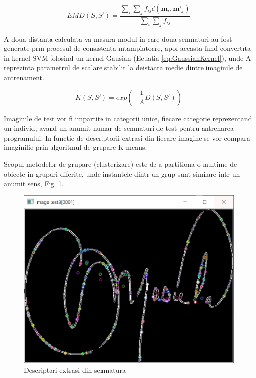 \documentclass[conference]{IEEEtran}
\begin{document}
\begin{equation} \label{eq:EarthMoversDistance}
EMD(S,S')=\frac{\sum_{i}\sum_{j}f_{ij}d(\textbf{m}_{i},\textbf{m'}_{j})}{\sum_{i}\sum_{j}f_{ij}}
\end{equation}

A doua distanta calculata va masura modul in care doua semnaturi au fost generate prin procesul de consistenta intamplatoare, apoi aceasta fiind convertita in kernel SVM folosind un kernel Gausian (Ecuatia \ref{eq:GaussianKernel}), unde A reprezinta parametrul de scalare stabilit la deistanta medie dintre imaginile de antrenament.

\begin{equation} \label{eq:GaussianKernel}
K(S,S')=exp(-\frac{1}{A}D(S,S'))
\end{equation}

Imaginile de test vor fi impartite in categorii unice, fiecare categorie reprezentand un individ, avand un anumit numar de semnaturi de test pentru antrenarea programului. In functie de descriptorii extrasi din fiecare imagine se vor compara imaginilie prin algoritmul de grupare K-means. \cite{b8}

Scopul metodelor de grupare (clusterizare) este de a partitiona o multime de obiecte in grupuri diferite, unde instantele dintr-un grup sunt similare intr-un anumit sens, Fig. \ref{fig:DescriptoriSemnatura}. 

\begin{figure}[h!]
	\centering
	\includegraphics[scale=0.35]{Figures/DescriptoriSemnatura.PNG}
	\caption{Descriptori extrasi din semnatura}
	\label{fig:DescriptoriSemnatura}
\end{figure}
\end{document}
